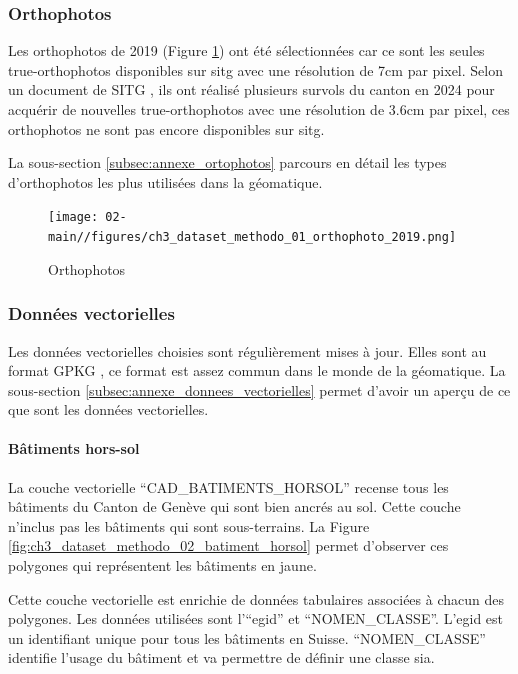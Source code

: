 \subsubsection{Orthophotos}
Les orthophotos de 2019 (Figure \ref{fig:ch3_dataset_methodo_01_orthophoto_2019}) ont été sélectionnées car ce sont les seules true-orthophotos disponibles sur \acrshort{sitg} avec une résolution de 7cm par pixel. Selon un document de SITG \cite{etat_de_geneve_inventaire_2025}, ils ont réalisé plusieurs survols du canton en 2024 pour acquérir de nouvelles true-orthophotos avec une résolution de 3.6cm par pixel, ces orthophotos ne sont pas encore disponibles sur \acrshort{sitg}.

La sous-section \ref{subsec:annexe_ortophotos} parcours en détail les types d'orthophotos les plus utilisées dans la géomatique.

\begin{figure}[H]
    \centering
    \texttt{[image: 02-main//figures/ch3\_dataset\_methodo\_01\_orthophoto\_2019.png]}
    \caption{Orthophotos}
    \label{fig:ch3_dataset_methodo_01_orthophoto_2019}
\end{figure}

\subsubsection{Données vectorielles}
Les données vectorielles choisies sont régulièrement mises à jour. Elles sont au format GPKG \cite{noauthor_ogc_nodate}, ce format est assez commun dans le monde de la géomatique. La sous-section \ref{subsec:annexe_donnees_vectorielles} permet d'avoir un aperçu de ce que sont les données vectorielles.
\paragraph{Bâtiments hors-sol}
La couche vectorielle ``CAD\_BATIMENTS\_HORSOL'' \cite{sitg_batiments_nodate} recense tous les bâtiments du Canton de Genève qui sont bien ancrés au sol. Cette couche n'inclus pas les bâtiments qui sont sous-terrains. La Figure \ref{fig:ch3_dataset_methodo_02_batiment_horsol} permet d'observer ces polygones qui représentent les bâtiments en jaune.

Cette couche vectorielle est enrichie de données tabulaires associées à chacun des polygones. Les données utilisées sont l'``\gls{egid}'' et ``NOMEN\_CLASSE''. L'\gls{egid} est un identifiant unique pour tous les bâtiments en Suisse. ``NOMEN\_CLASSE'' identifie l'usage du bâtiment et va permettre de définir une classe \gls{sia}.

